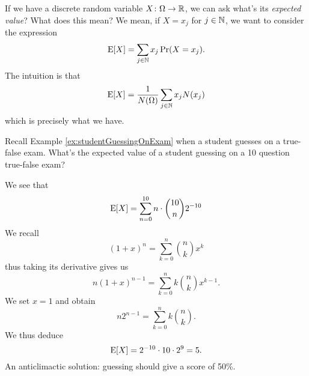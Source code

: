 \M
If we have a discrete random variable $X\colon\Omega\to\mathbb{R}$, we
can ask what's its \emph{expected value}? What does this mean? We mean,
if $X=x_{j}$ for $j\in\mathbb{N}$, we want to consider the expression
\begin{equation}
\mathrm{E}[X]=\sum_{j\in\mathbb{N}}x_{j}\mathop{\mathrm{Pr}}\nolimits(X=x_{j}).
\end{equation}
The intuition is that
\begin{equation}
\mathrm{E}[X] = \frac{1}{N(\Omega)}\sum_{j\in\mathbb{N}}x_{j}N(x_{j})
\end{equation}
which is precisely what we have.

Recall Example \ref{ex:studentGuessingOnExam} when a student guesses on
a true-false exam. What's the expected value of a student guessing on a
10 question true-false exam?

We see that
\begin{equation}
\mathrm{E}[X] = \sum^{10}_{n=0}n\cdot\binom{10}{n}2^{-10}
\end{equation}
We recall
\begin{equation}
(1+x)^{n}=\sum^{n}_{k=0}\binom{n}{k}x^{k}
\end{equation}
thus taking its derivative gives us
\begin{equation}
n(1+x)^{n-1}=\sum^{n}_{k=0}k\binom{n}{k}x^{k-1}.
\end{equation}
We set $x=1$ and obtain
\begin{equation}
n2^{n-1}=\sum^{n}_{k=0}k\binom{n}{k}.
\end{equation}
We thus deduce
\begin{equation}
\mathrm{E}[X]=2^{-10}\cdot 10\cdot2^{9}=5.
\end{equation}
An anticlimactic solution: guessing should give a score of 50\%.

